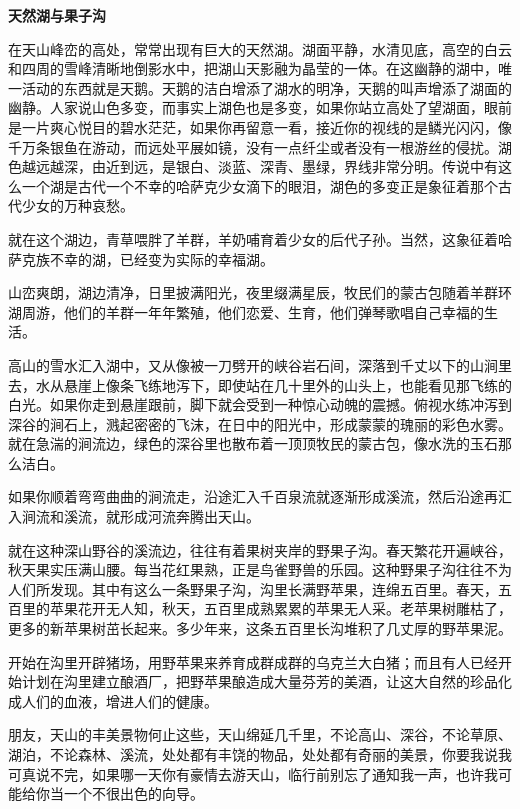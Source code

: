 \documentclass[12pt,UTF-8,openany]{ctexbook}
\begin{document}
\begin{large}
    \begin{center}
    
    \begin{large}\textbf{天然湖与果子沟}\end{large}
    
    \end{center}
    
    在天山峰峦的高处，常常出现有巨大的天然湖。湖面平静，水清见底，高空的白云和四周的雪峰清晰地倒影水中，把湖山天影融为晶莹的一体。在这幽静的湖中，唯一活动的东西就是天鹅。天鹅的洁白增添了湖水的明净，天鹅的叫声增添了湖面的幽静。人家说山色多变，而事实上湖色也是多变，如果你站立高处了望湖面，眼前是一片爽心悦目的碧水茫茫，如果你再留意一看，接近你的视线的是鳞光闪闪，像千万条银鱼在游动，而远处平展如镜，没有一点纤尘或者没有一根游丝的侵扰。湖色越远越深，由近到远，是银白、淡蓝、深青、墨绿，界线非常分明。传说中有这么一个湖是古代一个不幸的哈萨克少女滴下的眼泪，湖色的多变正是象征着那个古代少女的万种哀愁。
    
    就在这个湖边，青草喂胖了羊群，羊奶哺育着少女的后代子孙。当然，这象征着哈萨克族不幸的湖，已经变为实际的幸福湖。
    
    山峦爽朗，湖边清净，日里披满阳光，夜里缀满星辰，牧民们的蒙古包随着羊群环湖周游，他们的羊群一年年繁殖，他们恋爱、生育，他们弹琴歌唱自己幸福的生活。
    
    高山的雪水汇入湖中，又从像被一刀劈开的峡谷岩石间，深落到千丈以下的山涧里去，水从悬崖上像条飞练地泻下，即使站在几十里外的山头上，也能看见那飞练的白光。如果你走到悬崖跟前，脚下就会受到一种惊心动魄的震撼。俯视水练冲泻到深谷的涧石上，溅起密密的飞沫，在日中的阳光中，形成蒙蒙的瑰丽的彩色水雾。就在急湍的涧流边，绿色的深谷里也散布着一顶顶牧民的蒙古包，像水洗的玉石那么洁白。
    
    如果你顺着弯弯曲曲的涧流走，沿途汇入千百泉流就逐渐形成溪流，然后沿途再汇入涧流和溪流，就形成河流奔腾出天山。
    
    就在这种深山野谷的溪流边，往往有着果树夹岸的野果子沟。春天繁花开遍峡谷，秋天果实压满山腰。每当花红果熟，正是鸟雀野兽的乐园。这种野果子沟往往不为人们所发现。其中有这么一条野果子沟，沟里长满野苹果，连绵五百里。春天，五百里的苹果花开无人知，秋天，五百里成熟累累的苹果无人采。老苹果树雕枯了，更多的新苹果树茁长起来。多少年来，这条五百里长沟堆积了几丈厚的野苹果泥。
    
    开始在沟里开辟猪场，用野苹果来养育成群成群的乌克兰大白猪；而且有人已经开始计划在沟里建立酿酒厂，把野苹果酿造成大量芬芳的美酒，让这大自然的珍品化成人们的血液，增进人们的健康。
    
    朋友，天山的丰美景物何止这些，天山绵延几千里，不论高山、深谷，不论草原、湖泊，不论森林、溪流，处处都有丰饶的物品，处处都有奇丽的美景，你要我说我可真说不完，如果哪一天你有豪情去游天山，临行前别忘了通知我一声，也许我可能给你当一个不很出色的向导。
    
\end{large}
\end{document}
